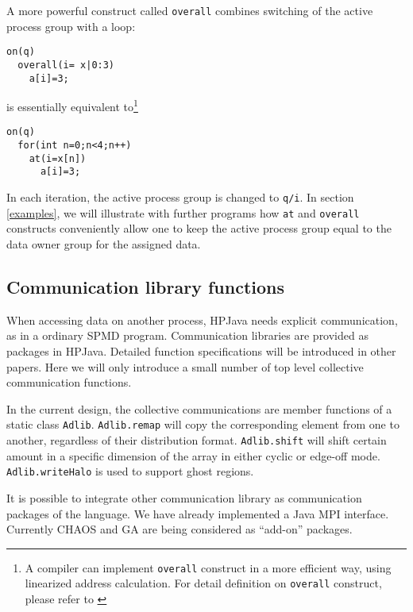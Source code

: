 A more powerful construct called \texttt{overall}
combines switching of the active process group with a loop:
\small
\begin{verbatim}
on(q)
  overall(i= x|0:3)
    a[i]=3;
\end{verbatim}
\normalsize
is essentially equivalent to\footnote{A compiler can implement
\texttt{overall} construct in a more efficient way, using linearized
address calculation. For detail definition on \texttt{overall}
construct, please refer to \cite{Car98}}
\small
\begin{verbatim}
on(q) 
  for(int n=0;n<4;n++)
    at(i=x[n])
      a[i]=3;
\end{verbatim}
\normalsize
In each iteration, the active process group is changed to
\texttt{q/i}.
In section \ref{examples}, we will illustrate with further programs how
\texttt{at} and \texttt{overall} constructs conveniently allow one to
keep the active process group equal to the data owner group for the
assigned data.

\subsection{Communication library functions}
\label{communication}

When accessing data on another process, HPJava needs explicit
communication, as in a ordinary SPMD program. 
Communication libraries are provided as packages in HPJava. Detailed
function specifications will be introduced in other papers. Here we
will only introduce a small number of top level collective
communication functions.

In the current design, the collective communications are member
functions of a static class \texttt{Adlib}.
\texttt{Adlib.remap} will copy the corresponding element from one to
another, regardless of their distribution format. \texttt{Adlib.shift}
will shift certain amount in a specific dimension of the array in
either cyclic or edge-off mode. \texttt{Adlib.writeHalo} is used to
support ghost regions.

It is possible to integrate other communication library as
communication packages of the language.  We have already implemented
a Java MPI interface. Currently CHAOS \cite{Das94} and GA \cite{Nie96}
are being considered as ``add-on'' packages.

